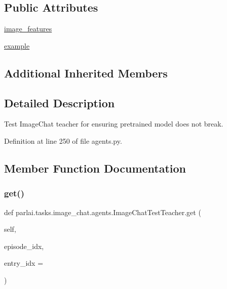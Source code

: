\subsection*{Public Attributes}
\begin{DoxyCompactItemize}
\item 
\hyperlink{classparlai_1_1tasks_1_1image__chat_1_1agents_1_1ImageChatTestTeacher_a80425539c895043b514564eb38961bf6}{image\+\_\+features}
\item 
\hyperlink{classparlai_1_1tasks_1_1image__chat_1_1agents_1_1ImageChatTestTeacher_a7a723dab72ffcb3a7b39d0548fec9e79}{example}
\end{DoxyCompactItemize}
\subsection*{Additional Inherited Members}


\subsection{Detailed Description}
\begin{DoxyVerb}Test ImageChat teacher for ensuring pretrained model does not break.
\end{DoxyVerb}
 

Definition at line 250 of file agents.\+py.



\subsection{Member Function Documentation}
\mbox{\label{classparlai_1_1tasks_1_1image__chat_1_1agents_1_1ImageChatTestTeacher_a62eff78b8f32b86c39804a644c3337f6}} 
\subsubsection{\texorpdfstring{get()}{get()}}
{\footnotesize\ttfamily def parlai.\+tasks.\+image\+\_\+chat.\+agents.\+Image\+Chat\+Test\+Teacher.\+get (\begin{DoxyParamCaption}\item[{}]{self,  }\item[{}]{episode\+\_\+idx,  }\item[{}]{entry\+\_\+idx = {} }\end{DoxyParamCaption})}

